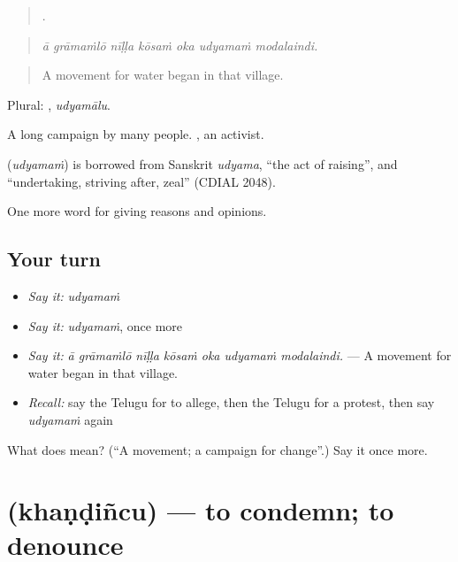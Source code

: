 \begin{quote}
      .
\end{quote}

\begin{quote}
\emph{ā grāmaṁlō nīḷḷa kōsaṁ oka udyamaṁ modalaindi.}
\end{quote}

\begin{quote}
A movement for water began in that village.
\end{quote}

Plural: , \emph{udyamālu}.

A long campaign by many people. , an activist.

\begin{cousinweb}
\textbf{} (\emph{udyamaṁ}) is borrowed from Sanskrit \emph{udyama}, \textquotedblleft{}the act of raising\textquotedblright{}, and \textquotedblleft{}undertaking, striving after, zeal\textquotedblright{} (CDIAL 2048).
\end{cousinweb}

\begin{grammarlens}[title={What you've built}]
One more word for giving reasons and opinions.
\end{grammarlens}

\subsection*{Your turn}
\begin{itemize}
\raggedright
  \item \emph{Say it:} \emph{udyamaṁ}
  \item \emph{Say it:} \emph{udyamaṁ}, once more
  \item \emph{Say it:} \emph{ā grāmaṁlō nīḷḷa kōsaṁ oka udyamaṁ modalaindi.} — A movement for water began in that village.
  \item \emph{Recall:} say the Telugu for to allege, then the Telugu for a protest, then say \emph{udyamaṁ} again
\end{itemize}

\begin{tcolorbox}[breakable,colback=teal!4,colframe=teal!35!black,title={Before you move on}]
What does  mean? (\textquotedblleft{}A movement; a campaign for change\textquotedblright{}.) Say it once more.
\end{tcolorbox}
\section[\texorpdfstring{\te{ఖండించు} (khaṇḍiñcu)}{ఖండించు (khaṇḍiñcu)}]{ (khaṇḍiñcu) — to condemn; to denounce}

